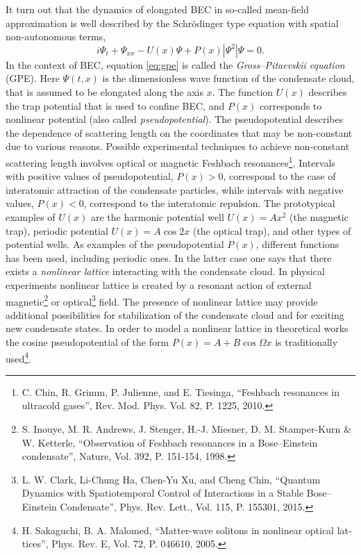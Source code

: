 \documentclass[candidate, href, colorlinks]{disser}
\begin{document}
It turn out that the dynamics of elongated BEC in so-called mean-field approximation is well described by the Schr\"odinger type equation with spatial non-autonomous terms,
\begin{equation}
	i \Psi_t + \Psi_{xx} - U(x) \Psi + P(x) |\Psi^2| \Psi = 0.
\label{eq:gpe}
\end{equation}
In the context of BEC, equation \eqref{eq:gpe} is called the {\it Gross--Pitaevskii equation} (GPE).
Here $\Psi(t, x)$ is the dimensionless wave function of the condensate cloud, that is assumed to be elongated along the axis $x$.
The function $U(x)$ describes the trap potential that is used to confine BEC, and $P(x)$ corresponds to nonlinear potential (also called {\it pseudopotential}).
The pseudopotential describes the dependence of scattering length on the coordinates that may be non-constant due to various reasons.
Possible experimental techniques to achieve non-constant scattering length involves optical or magnetic Feshbach resonances\footnote{C. Chin, R. Grimm, P. Julienne, and E. Tiesinga, ``Feshbach resonances in ultracold gases'', Rev. Mod. Phys. Vol. 82, P. 1225, 2010.}.
Intervals with positive values of pseudopotential, $P(x) > 0$, correspond to the case of interatomic attraction of the condensate particles, while intervals with negative values, $P(x) < 0$, correspond to the interatomic repulsion.
The prototypical examples of $U(x)$ are the harmonic potential well $U(x) = Ax^2$ (the magnetic trap), periodic potential $U(x) = A \cos 2x$ (the optical trap), and other types of potential wells.
%
As examples of the pseudopotential $P(x)$, different functions has been used, including periodic ones.
In the latter case one says that there exists a {\it nonlinear lattice} interacting with the condensate cloud.
In physical experiments nonlinear lattice is created by a resonant action of external magnetic\footnote{S. Inouye, M. R. Andrews, J. Stenger, H.-J. Miesner, D. M. Stamper-Kurn \& W. Ketterle, ``Observation of Feshbach resonances in a Bose--Einstein condensate'', Nature, Vol. 392, P. 151-154, 1998.} or optical\footnote{L. W. Clark, Li-Chung Ha, Chen-Yu Xu, and Cheng Chin, ``Quantum Dynamics with Spatiotemporal Control of Interactions in a Stable Bose--Einstein Condensate'', Phys. Rev. Lett., Vol. 115, P. 155301, 2015.} field.
The presence of nonlinear lattice may provide additional possibilities for stabilization of the condensate cloud and for exciting new condensate states.
In order to model a nonlinear lattice in theoretical works the cosine pseudopotential of the form $P(x) = A + B \cos \Omega x$ is traditionally used\footnote{\label{note:malomed} H. Sakaguchi,  B. A. Malomed, ``Matter-wave solitons in nonlinear optical lat­tices'', Phys. Rev. E, Vol. 72, P. 046610, 2005.}.
\end{document}
